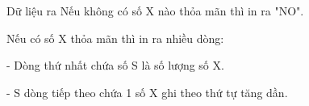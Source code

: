 Dữ liệu ra
Nếu không có số X nào thỏa mãn thì in ra "NO".  

   Nếu có số X thỏa mãn thì in ra nhiều dòng:   


   - Dòng thứ nhất chứa số S là số lượng số X.   


   - S dòng tiếp theo chứa 1 số X ghi theo thứ tự tăng dần.